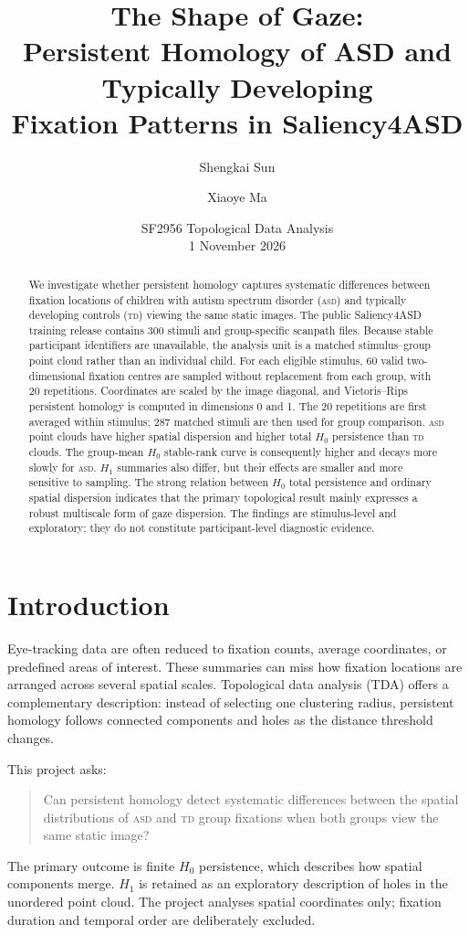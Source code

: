 \documentclass[11pt,a4paper]{article}
\title{The Shape of Gaze:\\
Persistent Homology of ASD and Typically Developing\\
Fixation Patterns in Saliency4ASD}
\author{Shengkai Sun \and Xiaoye Ma}
\date{SF2956 Topological Data Analysis\\1 November 2026}
\newcommand{\ASD}{\textsc{asd}}
\newcommand{\TD}{\textsc{td}}
\begin{document}
\maketitle

\begin{abstract}
We investigate whether persistent homology captures systematic differences
between fixation locations of children with autism spectrum disorder (\ASD)
and typically developing controls (\TD) viewing the same static images.  The
public Saliency4ASD training release contains 300 stimuli and group-specific
scanpath files.  Because stable participant identifiers are unavailable, the
analysis unit is a matched stimulus--group point cloud rather than an
individual child.  For each eligible stimulus, 60 valid two-dimensional
fixation centres are sampled without replacement from each group, with 20
repetitions.  Coordinates are scaled by the image diagonal, and
Vietoris--Rips persistent homology is computed in dimensions 0 and 1.  The 20
repetitions are first averaged within stimulus; 287 matched stimuli are then
used for group comparison.  \ASD{} point clouds have higher spatial dispersion
and higher total $H_0$ persistence than \TD{} clouds.  The group-mean $H_0$
stable-rank curve is consequently higher and decays more slowly for \ASD.
$H_1$ summaries also differ, but their effects are smaller and more sensitive
to sampling.  The strong relation between $H_0$ total persistence and ordinary
spatial dispersion indicates that the primary topological result mainly
expresses a robust multiscale form of gaze dispersion.  The findings are
stimulus-level and exploratory; they do not constitute participant-level
diagnostic evidence.
\end{abstract}

\section{Introduction}

Eye-tracking data are often reduced to fixation counts, average coordinates,
or predefined areas of interest.  These summaries can miss how fixation
locations are arranged across several spatial scales.  Topological data
analysis (TDA) offers a complementary description: instead of selecting one
clustering radius, persistent homology follows connected components and holes
as the distance threshold changes.

This project asks:
\begin{quote}
Can persistent homology detect systematic differences between the spatial
distributions of \ASD{} and \TD{} group fixations when both groups view the
same static image?
\end{quote}
The primary outcome is finite $H_0$ persistence, which describes how spatial
components merge.  $H_1$ is retained as an exploratory description of holes
in the unordered point cloud.  The project analyses spatial coordinates only;
fixation duration and temporal order are deliberately excluded.
\end{document}
